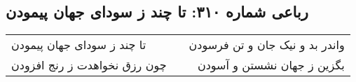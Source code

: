 \begin{center}
\section*{رباعی شماره ۳۱۰: تا چند ز سودای جهان پیمودن}
\label{sec:sh310}
\begin{longtable}{l p{0.5cm} r}
تا چند ز سودای جهان پیمودن
&&
واندر بد و نیک جان و تن فرسودن
\\
چون رزق نخواهدت ز رنج افزودن
&&
بگزین ز جهان نشستن و آسودن
\\
\end{longtable}
\end{center}
